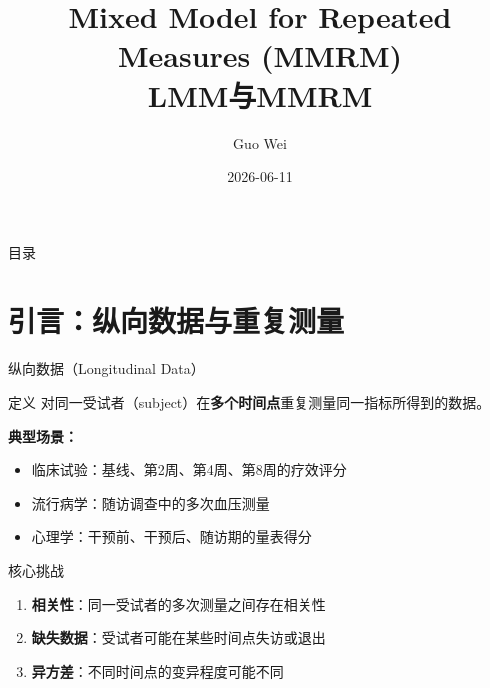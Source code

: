 \documentclass[aspectratio=169,11pt]{beamer}
\title[MMRM教学]{Mixed Model for Repeated Measures (MMRM)\\
LMM与MMRM}
\author[MMRM Tutorial]{Guo Wei}
\institute{Department of Health Statistics, NMU}
\date{2026-06-11}
\begin{document}
\begin{frame}[plain]
\titlepage
\end{frame}

\begin{frame}{目录}
\tableofcontents
\end{frame}

\section{引言：纵向数据与重复测量}

\begin{frame}{纵向数据（Longitudinal Data）}
\begin{block}{定义}
对同一受试者（subject）在\textbf{多个时间点}重复测量同一指标所得到的数据。
\end{block}

\vspace{0.2cm}
\textbf{典型场景：}
\begin{itemize}
    \item 临床试验：基线、第2周、第4周、第8周的疗效评分
    \item 流行病学：随访调查中的多次血压测量
    \item 心理学：干预前、干预后、随访期的量表得分
\end{itemize}

\vspace{0.2cm}
\begin{alertblock}{核心挑战}
\begin{enumerate}
    \item \textbf{相关性}：同一受试者的多次测量之间存在相关性
    \item \textbf{缺失数据}：受试者可能在某些时间点失访或退出
    \item \textbf{异方差}：不同时间点的变异程度可能不同
\end{enumerate}
\end{alertblock}
\end{frame}
\end{document}
